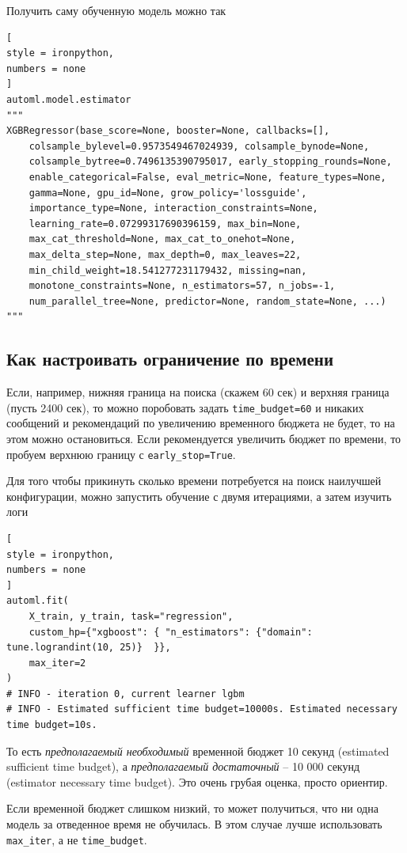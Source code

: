 \documentclass[%
	11pt,
	a4paper,
	utf8,
		]{article}
\begin{document}
Получить саму обученную модель можно так
\begin{lstlisting}[
style = ironpython,
numbers = none
]
automl.model.estimator 
"""
XGBRegressor(base_score=None, booster=None, callbacks=[],
	colsample_bylevel=0.9573549467024939, colsample_bynode=None,
	colsample_bytree=0.7496135390795017, early_stopping_rounds=None,
	enable_categorical=False, eval_metric=None, feature_types=None,
	gamma=None, gpu_id=None, grow_policy='lossguide',
	importance_type=None, interaction_constraints=None,
	learning_rate=0.07299317690396159, max_bin=None,
	max_cat_threshold=None, max_cat_to_onehot=None,
	max_delta_step=None, max_depth=0, max_leaves=22,
	min_child_weight=18.541277231179432, missing=nan,
	monotone_constraints=None, n_estimators=57, n_jobs=-1,
	num_parallel_tree=None, predictor=None, random_state=None, ...)
"""
\end{lstlisting}

\subsection{Как настроивать ограничение по времени}

Если, например, нижняя граница на поиска (скажем 60 сек) и верхняя граница (пусть 2400 сек), то можно поробовать задать \verb|time_budget=60| и никаких сообщений и рекомендаций по увеличению временного бюджета не будет, то на этом можно остановиться. Если рекомендуется увеличить бюджет по времени, то пробуем верхнюю границу с \verb|early_stop=True|.

Для того чтобы прикинуть сколько времени потребуется на поиск наилучшей конфигурации, можно запустить обучение с двумя итерациями, а затем изучить логи
\begin{lstlisting}[
style = ironpython,
numbers = none
]
automl.fit(
    X_train, y_train, task="regression",
    custom_hp={"xgboost": { "n_estimators": {"domain": tune.lograndint(10, 25)}  }},
    max_iter=2
)
# INFO - iteration 0, current learner lgbm
# INFO - Estimated sufficient time budget=10000s. Estimated necessary time budget=10s.
\end{lstlisting}

То есть \emph{предполагаемый необходимый} временной бюджет 10 секунд (estimated sufficient time budget), а \emph{предполагаемый достаточный} -- 10 000 секунд (estimator necessary time budget). Это очень грубая оценка, просто ориентир.

Если временной бюджет слишком низкий, то может получиться, что ни одна модель за отведенное время не обучилась. В этом случае лучше использовать \verb|max_iter|, а не \verb|time_budget|.
\end{document}
